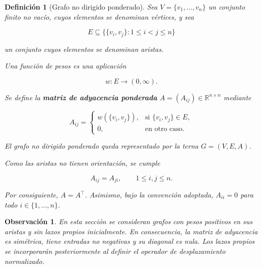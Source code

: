 \documentclass[a4paper,openany,oneside,10pt]{report}
\theoremstyle{pnlTeorema}
\theoremstyle{pnlDefinicion}
\newtheorem{definicion}{Definición}[section]
\theoremstyle{pnlObservacion}
\newtheorem{observacion}{Observación}[section]
\begin{document}
\begin{definicion}[Grafo no dirigido ponderado]\label{def:grafo-ponderado}
Sea \(V=\{v_1,\ldots,v_n\}\) un conjunto finito no vacío, cuyos elementos se denominan \emph{vértices}, y sea

\[
E\subseteq\bigl\{\{v_i,v_j\}:1\le i<j\le n\bigr\}
\]

un conjunto cuyos elementos se denominan \emph{aristas}.

Una función de pesos es una aplicación

\[
w:E\longrightarrow(0,\infty).
\]

Se define la \textbf{matriz de adyacencia ponderada} \(A=(A_{ij})\in\mathbb R^{n\times n}\) mediante

\[
A_{ij}=
\begin{cases}
w(\{v_i,v_j\}),&\text{si }\{v_i,v_j\}\in E,\\
0,&\text{en otro caso}.
\end{cases}
\]

El grafo no dirigido ponderado queda representado por la terna \(G=(V,E,A)\).

Como las aristas no tienen orientación, se cumple

\[
A_{ij}=A_{ji},
\qquad 1\le i,j\le n.
\]

Por consiguiente, \(A=A^\top\). Asimismo, bajo la convención adoptada, \(A_{ii}=0\) para todo \(i\in\{1,\ldots,n\}\).

\end{definicion}

\begin{observacion}
En esta sección se consideran grafos con pesos positivos en sus aristas y sin lazos propios inicialmente. En consecuencia, la matriz de adyacencia es simétrica, tiene entradas no negativas y su diagonal es nula. Los lazos propios se incorporarán posteriormente al definir el operador de desplazamiento normalizado.
\end{observacion}
\end{document}
